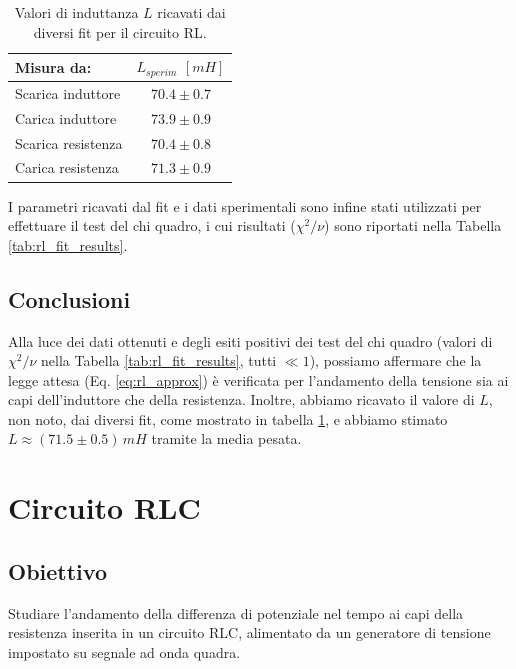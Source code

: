 \documentclass[a4paper]{article}
\begin{document}
\begin{table}[htbp] %
\centering
\begin{tabular}{|l|c|}
\hline
Misura da: & $L_{sperim}$ $[\si{mH}]$ \\ %
\hline
Scarica induttore & $70.4 \pm 0.7$  \\ %
Carica induttore  & $73.9 \pm 0.9$ \\ %
Scarica resistenza & $70.4 \pm 0.8$ \\ %
Carica resistenza & $71.3 \pm 0.9$ \\ %
\hline
\end{tabular}
\caption{Valori di induttanza $L$ ricavati dai diversi fit per il circuito RL.}
\label{tab:rl_induttanze_ricavate}
\end{table}

I parametri ricavati dal fit e i dati sperimentali sono infine stati utilizzati per effettuare il test del chi quadro, i cui risultati ($\chi^2/\nu$) sono riportati nella Tabella \ref{tab:rl_fit_results}.


\subsection{Conclusioni}
Alla luce dei dati ottenuti e degli esiti positivi dei test del chi quadro (valori di $\chi^2/\nu$ nella Tabella \ref{tab:rl_fit_results}, tutti $\ll 1$), possiamo affermare che la legge attesa (Eq. \ref{eq:rl_approx}) è verificata per l'andamento della tensione sia ai capi dell'induttore che della resistenza. Inoltre, abbiamo ricavato il valore di $L$, non noto, dai diversi fit, come mostrato in tabella \ref{tab:rl_induttanze_ricavate}, e abbiamo stimato $L \approx (71.5 \pm 0.5) \, \si{mH}$ tramite la media pesata.


\section{Circuito RLC}
\subsection{Obiettivo}
Studiare l'andamento della differenza di potenziale nel tempo ai capi della resistenza inserita in un circuito RLC, alimentato da un generatore di tensione impostato su segnale ad onda quadra.
\end{document}
